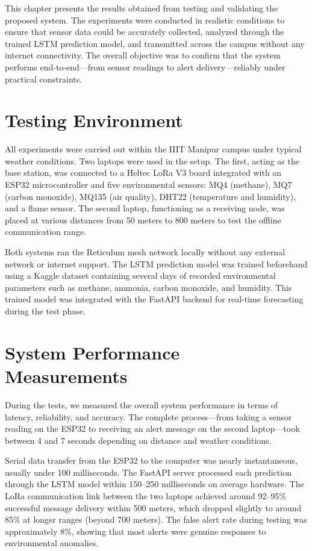 

This chapter presents the results obtained from testing and validating the proposed system. The experiments were conducted in realistic conditions to ensure that sensor data could be accurately collected, analyzed through the trained LSTM prediction model, and transmitted across the campus without any internet connectivity. The overall objective was to confirm that the system performs end-to-end—from sensor readings to alert delivery—reliably under practical constraints.

\section{Testing Environment}
All experiments were carried out within the IIIT Manipur campus under typical weather conditions. Two laptops were used in the setup. The first, acting as the base station, was connected to a Heltec LoRa V3 board integrated with an ESP32 microcontroller and five environmental sensors: MQ4 (methane), MQ7 (carbon monoxide), MQ135 (air quality), DHT22 (temperature and humidity), and a flame sensor. The second laptop, functioning as a receiving node, was placed at various distances from 50 meters to 800 meters to test the offline communication range.

Both systems ran the Reticulum mesh network locally without any external network or internet support. The LSTM prediction model was trained beforehand using a Kaggle dataset containing several days of recorded environmental parameters such as methane, ammonia, carbon monoxide, and humidity. This trained model was integrated with the FastAPI backend for real-time forecasting during the test phase.

\section{System Performance Measurements}
During the tests, we measured the overall system performance in terms of latency, reliability, and accuracy. The complete process—from taking a sensor reading on the ESP32 to receiving an alert message on the second laptop—took between 4 and 7 seconds depending on distance and weather conditions.

Serial data transfer from the ESP32 to the computer was nearly instantaneous, usually under 100 milliseconds. The FastAPI server processed each prediction through the LSTM model within 150–250 milliseconds on average hardware. The LoRa communication link between the two laptops achieved around 92–95\% successful message delivery within 500 meters, which dropped slightly to around 85\% at longer ranges (beyond 700 meters). The false alert rate during testing was approximately 8\%, showing that most alerts were genuine responses to environmental anomalies.

